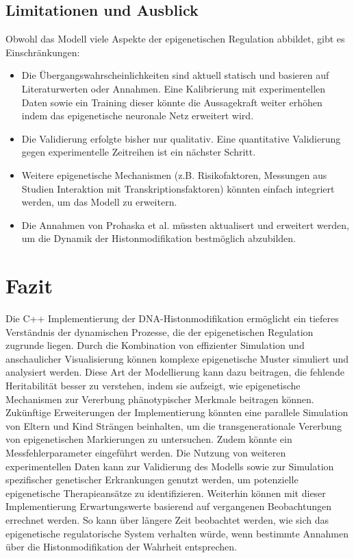 \documentclass{SeminarV2}
\begin{document}
\begin{itemize}
\subsection{Limitationen und Ausblick}
Obwohl das Modell viele Aspekte der epigenetischen Regulation abbildet, gibt es Einschr\"{a}nkungen:
\begin{itemize}
    \item Die \"{U}bergangswahrscheinlichkeiten sind aktuell statisch und basieren auf Literaturwerten oder Annahmen. Eine Kalibrierung mit experimentellen Daten sowie ein Training dieser k\"{o}nnte die Aussagekraft weiter erh\"{o}hen indem das epigenetische neuronale Netz erweitert wird.
    \item Die Validierung erfolgte bisher nur qualitativ. Eine quantitative Validierung gegen experimentelle Zeitreihen ist ein n\"{a}chster Schritt.
    \item Weitere epigenetische Mechanismen (z.B. Risikofaktoren, Messungen aus Studien Interaktion mit Transkriptionsfaktoren) k\"{o}nnten einfach integriert werden, um das Modell zu erweitern.
    \item Die Annahmen von Prohaska et al. müssten aktualisert und erweitert werden, um die Dynamik der Histonmodifikation bestmöglich abzubilden.
\end{itemize}

\section{Fazit}
Die C++ Implementierung der DNA-Histonmodifikation erm\"{o}glicht ein tieferes Verst\"{a}ndnis der dynamischen Prozesse, die der epigenetischen Regulation zugrunde liegen. Durch die Kombination von effizienter Simulation und anschaulicher Visualisierung k\"{o}nnen komplexe epigenetische Muster simuliert und analysiert werden.
Diese Art der Modellierung kann dazu beitragen, die fehlende Heritabilit\"{a}t besser zu verstehen, indem sie aufzeigt, wie epigenetische Mechanismen zur Vererbung ph\"{a}notypischer Merkmale beitragen k\"{o}nnen. 
Zuk\"{u}nftige Erweiterungen der Implementierung k\"{o}nnten eine parallele Simulation von Eltern und Kind Str\"{a}ngen beinhalten, um die transgenerationale Vererbung von epigenetischen Markierungen zu untersuchen.
Zudem könnte ein Messfehlerparameter eingeführt werden.
Die Nutzung von weiteren experimentellen Daten kann zur Validierung des Modells sowie zur Simulation spezifischer genetischer Erkrankungen genutzt werden, um potenzielle epigenetische Therapieans\"{a}tze zu identifizieren.
Weiterhin können mit dieser Implementierung Erwartungswerte basierend auf vergangenen Beobachtungen errechnet werden. So kann \"{u}ber l\"{a}ngere Zeit beobachtet werden, wie sich das epigenetische regulatorische System verhalten w\"{u}rde, wenn bestimmte Annahmen \"{u}ber die Histonmodifikation der Wahrheit entsprechen.


\end{itemize}
\end{document}
